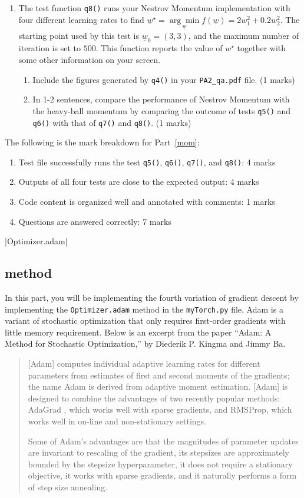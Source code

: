\documentclass{article}
\theoremstyle{definition}
\begin{document}
\begin{enumerate}[label=\ref{mom}.\alph*]
	\item \label{hhh}The test function \verb|q8()| runs your Nestrov Momentum implementation with four different learning rates to find $\underline{w}^\star = \underset{\underline{w}}{\arg \min} f(\underline{w}) = 2w_1^2 + 0.2w_2^2$. The starting point used by this test is $\underline{w}_0=(3,3)$, and the maximum number of iteration is set to $500$. This function reports the value of $w^\star$ together with some other information on your screen.
	\begin{enumerate}[label=\ref{hhh}.\roman*]
		\item Include the figures generated by \verb|q4()| in your \verb|PA2_qa.pdf| file. (1 marks)
		\item In 1-2 sentences, compare the performance of Nestrov Momentum with the heavy-ball momentum by comparing the outcome of tests \verb|q5()| and \verb|q6()| with that of \verb|q7()| and \verb|q8()|. (1 marks)
	\end{enumerate}
\end{enumerate}
The following is the mark breakdown for Part~\ref{mom}:
\begin{enumerate}[label=(\roman*)]
	\item Test file successfully runs the test \verb|q5()|, \verb|q6()|, \verb|q7()|, and \verb|q8()|: 4 marks
	\item Outputs of all four tests are close to the expected output: 4 marks
	\item Code content is organized well and annotated with comments: 1 marks
	\item Questions are answered correctly: 7 marks
\end{enumerate}
|Optimizer.adam|
\subsection{ method}\label{adam}
In this part, you will be implementing the fourth variation of gradient descent by implementing the \verb|Optimizer.adam| method in the \verb|myTorch.py| file. Adam is a variant of stochastic optimization that only requires first-order gradients with little memory requirement. Below is an excerpt from the paper ``Adam: A Method for Stochastic Optimization,'' by Diederik P. Kingma and Jimmy Ba.
\begin{quote}
	[Adam] computes individual adaptive learning rates for
	different parameters from estimates of first and second moments of the gradients; the name Adam
	is derived from adaptive moment estimation. [Adam] is designed to combine the advantages
	of two recently popular methods: AdaGrad , which works well with sparse gradients, and RMSProp, which works well in on-line and non-stationary
	settings.
	
	Some of Adam's advantages are that the magnitudes of parameter updates are invariant to
	rescaling of the gradient, its stepsizes are approximately bounded by the stepsize hyperparameter,
	it does not require a stationary objective, it works with sparse gradients, and it naturally performs a
	form of step size annealing.
\end{quote}
\end{document}
